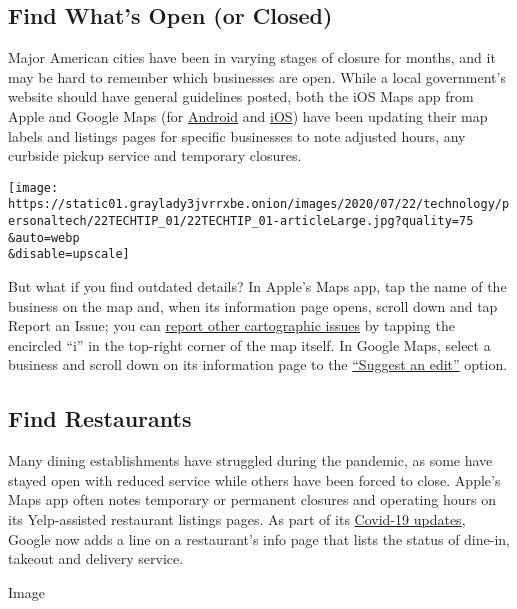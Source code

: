 \hypertarget{find-whats-open-or-closed}{%
\subsection{Find What's Open (or
Closed)}\label{find-whats-open-or-closed}}

Major American cities have been in varying stages of closure for months,
and it may be hard to remember which businesses are open. While a local
government's website should have general guidelines posted, both the iOS
Maps app from Apple and Google Maps (for
\href{https://play.google.com/store/apps/details?id=com.google.android.apps.maps\&hl=en_US}{Android}
and
\href{https://apps.apple.com/us/app/google-maps-transit-food/id585027354}{iOS})
have been updating their map labels and listings pages for specific
businesses to note adjusted hours, any curbside pickup service and
temporary closures.

\texttt{[image: https://static01.graylady3jvrrxbe.onion/images/2020/07/22/technology/personaltech/22TECHTIP\_01/22TECHTIP\_01-articleLarge.jpg?quality=75\\\&auto=webp\\\&disable=upscale]}

But what if you find outdated details? In Apple's Maps app, tap the name
of the business on the map and, when its information page opens, scroll
down and tap Report an Issue; you can
\href{https://support.apple.com/en-us/HT203080}{report other
cartographic issues} by tapping the encircled ``i'' in the top-right
corner of the map itself. In Google Maps, select a business and scroll
down on its information page to the
\href{https://support.google.com/local-guides/answer/7084895?co=GENIE.Platform\%3DAndroid\&hl=en-GB\&oco=1}{``Suggest
an edit''} option.

\hypertarget{find-restaurants}{%
\subsection{Find Restaurants}\label{find-restaurants}}

Many dining establishments have struggled during the pandemic, as some
have stayed open with reduced service while others have been forced to
close. Apple's Maps app often notes temporary or permanent closures and
operating hours on its Yelp-assisted restaurant listings pages. As part
of its \href{https://support.google.com/maps/answer/9795160}{Covid-19
updates}, Google now adds a line on a restaurant's info page that lists
the status of dine-in, takeout and delivery service.

Image

